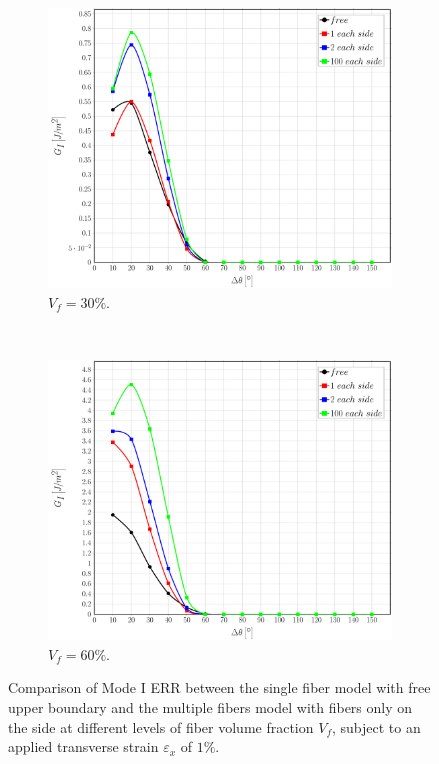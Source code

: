 \documentclass[review]{elsarticle}
\begin{document}
\begin{figure}[!h]
\centering
    \begin{subfigure}[b]{0.475\textwidth}
        \includegraphics[width=\textwidth]{comparefreesidefibers-vf30-GI.pdf}
        \caption{$V_{f}=30\%$.}\label{subfig:comparisonfree30MI}
    \end{subfigure} ~
    \begin{subfigure}[b]{0.475\textwidth}
        \includegraphics[width=\textwidth]{comparefreesidefibers-vf60-GI.pdf}
        \caption{$V_{f}=60\%$.}\label{subfig:comparisonfree60MI}
    \end{subfigure}

\caption{Comparison of Mode I ERR between the single fiber model with free upper boundary and the multiple fibers model with fibers only on the side at different levels of fiber volume fraction $V_{f}$, subject to an applied transverse strain $\varepsilon_{x}$ of $1\%$.}\label{fig:comparisonfreeMI}
\end{figure}
\end{document}
